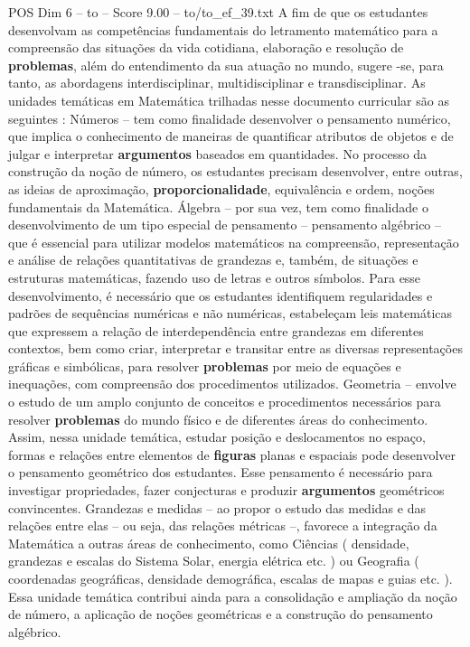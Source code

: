 \begin{textsample}{POS Dim 6 – to – Score 9.00 – to/to\_ef\_39.txt}
A fim de que os estudantes desenvolvam as competências fundamentais do letramento matemático para a compreensão das situações da vida cotidiana, elaboração e resolução de \textbf{problemas}, além do entendimento da sua atuação no mundo, sugere -se, para tanto, as abordagens interdisciplinar, multidisciplinar e transdisciplinar.
As unidades temáticas em Matemática trilhadas nesse documento curricular são as seguintes : Números – tem como finalidade desenvolver o pensamento numérico, que implica o conhecimento de maneiras de quantificar atributos de objetos e de julgar e interpretar \textbf{argumentos} baseados em quantidades.
No processo da construção da noção de número, os estudantes precisam desenvolver, entre outras, as ideias de aproximação, \textbf{proporcionalidade}, equivalência e ordem, noções fundamentais da Matemática.
Álgebra – por sua vez, tem como finalidade o desenvolvimento de um tipo especial de pensamento – pensamento algébrico – que é essencial para utilizar modelos matemáticos na compreensão, representação e análise de relações quantitativas de grandezas e, também, de situações e estruturas matemáticas, fazendo uso de letras e outros símbolos.
Para esse desenvolvimento, é necessário que os estudantes identifiquem regularidades e padrões de sequências numéricas e não numéricas, estabeleçam leis matemáticas que expressem a relação de interdependência entre grandezas em diferentes contextos, bem como criar, interpretar e transitar entre as diversas representações gráficas e simbólicas, para resolver \textbf{problemas} por meio de equações e inequações, com compreensão dos procedimentos utilizados.
Geometria – envolve o estudo de um amplo conjunto de conceitos e procedimentos necessários para resolver \textbf{problemas} do mundo físico e de diferentes áreas do conhecimento.
Assim, nessa unidade temática, estudar posição e deslocamentos no espaço, formas e relações entre elementos de \textbf{figuras} planas e espaciais pode desenvolver o pensamento geométrico dos estudantes.
Esse pensamento é necessário para investigar propriedades, fazer conjecturas e produzir \textbf{argumentos} geométricos convincentes.
Grandezas e medidas – ao propor o estudo das medidas e das relações entre elas – ou seja, das relações métricas –, favorece a integração da Matemática a outras áreas de conhecimento, como Ciências ( densidade, grandezas e escalas do Sistema Solar, energia elétrica etc. ) ou Geografia ( coordenadas geográficas, densidade demográfica, escalas de mapas e guias etc. ).
Essa unidade temática contribui ainda para a consolidação e ampliação da noção de número, a aplicação de noções geométricas e a construção do pensamento algébrico.

\end{textsample}
